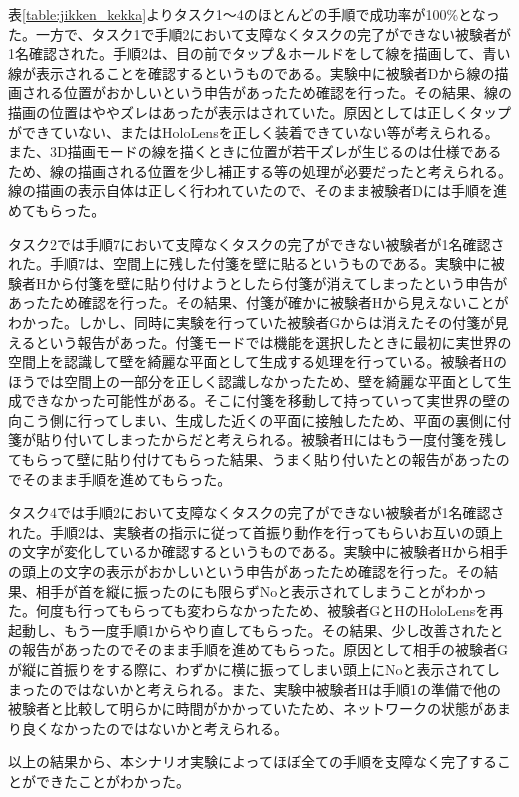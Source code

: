 \documentclass[11pt,a4j, titlepage]{jarticle} %
\begin{document}
表\ref{table:jikken_kekka}よりタスク1～4のほとんどの手順で成功率が100\%となった。一方で、タスク1で手順2において支障なくタスクの完了ができない被験者が1名確認された。手順2は、目の前でタップ＆ホールドをして線を描画して、青い線が表示されることを確認するというものである。実験中に被験者Dから線の描画される位置がおかしいという申告があったため確認を行った。その結果、線の描画の位置はややズレはあったが表示はされていた。原因としては正しくタップができていない、またはHoloLensを正しく装着できていない等が考えられる。また、3D描画モードの線を描くときに位置が若干ズレが生じるのは仕様であるため、線の描画される位置を少し補正する等の処理が必要だったと考えられる。線の描画の表示自体は正しく行われていたので、そのまま被験者Dには手順を進めてもらった。

タスク2では手順7において支障なくタスクの完了ができない被験者が1名確認された。手順7は、空間上に残した付箋を壁に貼るというものである。実験中に被験者Hから付箋を壁に貼り付けようとしたら付箋が消えてしまったという申告があったため確認を行った。その結果、付箋が確かに被験者Hから見えないことがわかった。しかし、同時に実験を行っていた被験者Gからは消えたその付箋が見えるという報告があった。付箋モードでは機能を選択したときに最初に実世界の空間上を認識して壁を綺麗な平面として生成する処理を行っている。被験者Hのほうでは空間上の一部分を正しく認識しなかったため、壁を綺麗な平面として生成できなかった可能性がある。そこに付箋を移動して持っていって実世界の壁の向こう側に行ってしまい、生成した近くの平面に接触したため、平面の裏側に付箋が貼り付いてしまったからだと考えられる。被験者Hにはもう一度付箋を残してもらって壁に貼り付けてもらった結果、うまく貼り付いたとの報告があったのでそのまま手順を進めてもらった。

タスク4では手順2において支障なくタスクの完了ができない被験者が1名確認された。手順2は、実験者の指示に従って首振り動作を行ってもらいお互いの頭上の文字が変化しているか確認するというものである。実験中に被験者Hから相手の頭上の文字の表示がおかしいという申告があったため確認を行った。その結果、相手が首を縦に振ったのにも限らずNoと表示されてしまうことがわかった。何度も行ってもらっても変わらなかったため、被験者GとHのHoloLensを再起動し、もう一度手順1からやり直してもらった。その結果、少し改善されたとの報告があったのでそのまま手順を進めてもらった。原因として相手の被験者Gが縦に首振りをする際に、わずかに横に振ってしまい頭上にNoと表示されてしまったのではないかと考えられる。また、実験中被験者Hは手順1の準備で他の被験者と比較して明らかに時間がかかっていたため、ネットワークの状態があまり良くなかったのではないかと考えられる。

以上の結果から、本シナリオ実験によってほぼ全ての手順を支障なく完了することができたことがわかった。
\end{document}

